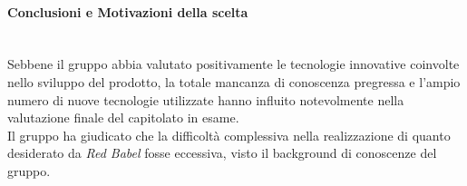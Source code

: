 \paragraph{Conclusioni e Motivazioni della scelta}\-\\
Sebbene il gruppo abbia valutato positivamente le tecnologie innovative coinvolte nello sviluppo del prodotto, la totale mancanza di conoscenza pregressa e l'ampio numero di nuove tecnologie utilizzate hanno influito notevolmente nella valutazione finale del capitolato in esame. \\
Il gruppo ha giudicato che la difficoltà complessiva nella realizzazione di quanto desiderato da \textit{Red Babel} fosse eccessiva, visto il background di conoscenze del gruppo.
